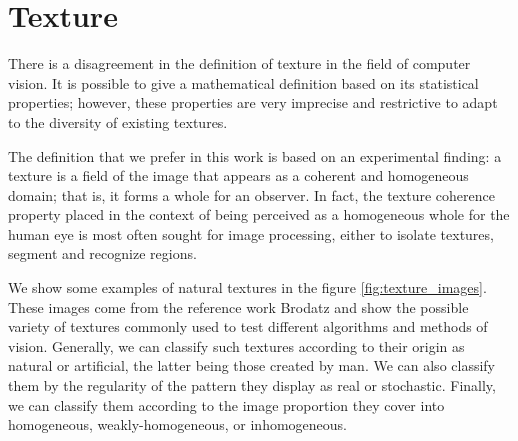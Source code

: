 \section{Texture}
There is a disagreement in the definition of texture in the field of computer vision. It is possible to give a mathematical definition based on its statistical properties; however, these properties are very imprecise and restrictive to adapt to the diversity of existing textures.

The definition that we prefer in this work is based on an experimental finding: a texture is a field of the image that appears as a coherent and homogeneous domain; that is, it forms a whole for an observer. In fact, the texture coherence property placed in the context of being perceived as a homogeneous whole for the human eye is most often sought for image processing, either to isolate textures, segment and recognize regions.

We show some examples of natural textures in the figure \ref{fig:texture_images}. These images come from the reference work Brodatz and show the possible variety of textures commonly used to test different algorithms and methods of vision. Generally, we can classify such textures according to their origin as natural or artificial, the latter being those created by man. We can also classify them by the regularity of the pattern they display as real or stochastic. Finally, we can classify them according to the image proportion they cover into homogeneous, weakly-homogeneous, or inhomogeneous.


